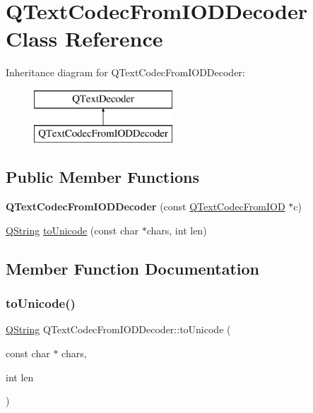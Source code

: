 \hypertarget{class_q_text_codec_from_i_o_d_decoder}{}\section{Q\+Text\+Codec\+From\+I\+O\+D\+Decoder Class Reference}
\label{class_q_text_codec_from_i_o_d_decoder}
Inheritance diagram for Q\+Text\+Codec\+From\+I\+O\+D\+Decoder\+:\begin{figure}[H]
\begin{center}
\leavevmode
\includegraphics[height=2.000000cm]{class_q_text_codec_from_i_o_d_decoder}
\end{center}
\end{figure}
\subsection*{Public Member Functions}
\begin{DoxyCompactItemize}
\item 
\mbox{\label{class_q_text_codec_from_i_o_d_decoder_abd504781495a962f51bcc5a07f4408f3}} 
{\bfseries Q\+Text\+Codec\+From\+I\+O\+D\+Decoder} (const \mbox{\hyperlink{class_q_text_codec_from_i_o_d}{Q\+Text\+Codec\+From\+I\+OD}} $\ast$c)
\item 
\mbox{\hyperlink{class_q_string}{Q\+String}} \mbox{\hyperlink{class_q_text_codec_from_i_o_d_decoder_af14a4c0bcf1d9ac1238ef609394d1e18}{to\+Unicode}} (const char $\ast$chars, int len)
\end{DoxyCompactItemize}


\subsection{Member Function Documentation}
\mbox{\label{class_q_text_codec_from_i_o_d_decoder_af14a4c0bcf1d9ac1238ef609394d1e18}} 
\subsubsection{\texorpdfstring{toUnicode()}{toUnicode()}}
{\footnotesize\ttfamily \mbox{\hyperlink{class_q_string}{Q\+String}} Q\+Text\+Codec\+From\+I\+O\+D\+Decoder\+::to\+Unicode (\begin{DoxyParamCaption}\item[{const char $\ast$}]{chars,  }\item[{int}]{len }\end{DoxyParamCaption})\hspace{0.3cm}{\ttfamily [virtual]}}

